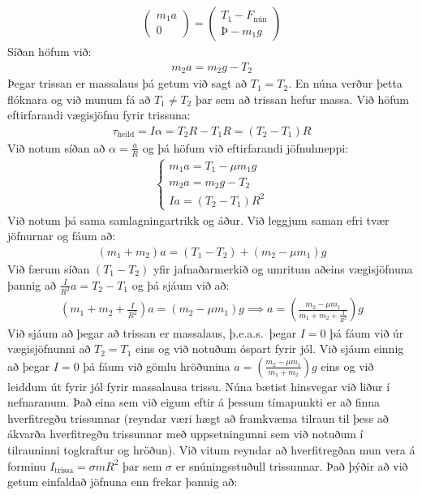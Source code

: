\begin{align*}
    \begin{pmatrix} m_1 a \\ 0 \end{pmatrix} = \begin{pmatrix}  T_1 - F_{\text{nún}} \\ Þ - m_1g \end{pmatrix}
\end{align*}
Síðan höfum við:
\begin{align*}
   m_2 a = m_2g - T_2
\end{align*}
Þegar trissan er massalaus þá getum við sagt að $T_1 = T_2$. En núna verður þetta flóknara og við munum fá að $T_1 \neq T_2$ þar sem að trissan hefur massa. Við höfum eftirfarandi vægisjöfnu fyrir trissuna:
\begin{align*}
    \tau_{\text{heild}} = I\alpha = T_2 R - T_1 R = (T_2-T_1)R
\end{align*}
Við notum síðan að $\alpha = \frac{a}{R}$ og þá höfum við eftirfarandi jöfnuhneppi:
\begin{align*}
    \begin{cases}
    m_1a = T_1 - \mu m_1 g \\
    m_2a = m_2g - T_2 \\
    Ia = (T_2 - T_1)R^2
    \end{cases}
\end{align*}
Við notum þá sama samlagningartrikk og áður. Við leggjum saman efri tvær jöfnurnar og fáum að:
\begin{align*}
    \left(m_1 + m_2\right)a = (T_1 - T_2) + \left( m_2 - \mu m_1\right)g
\end{align*}
Við færum síðan $(T_1 - T_2)$ yfir jafnaðarmerkið og umritum aðeins vægisjöfnuna þannig að $\frac{I}{R^2}a = T_2 - T_1$ og þá sjáum við að:
\begin{align*}
    \left(m_1 + m_2 + \frac{I}{R^2}\right)a = \left(m_2 - \mu m_1 \right)g \implies a = \left(\frac{m_2 - \mu m_1}{m_1 + m_2 + \frac{I}{R^2}} \right)g
\end{align*}
Við sjáum að þegar að trissan er massalaus, þ.e.a.s.~þegar $I = 0$ þá fáum við úr vægisjöfnunni að $T_2 = T_1$ eins og við notuðum óspart fyrir jól. Við sjáum einnig að þegar $I = 0$ þá fáum við gömlu hröðunina $a = \left(\frac{m_2 - \mu m_1}{m_1 + m_2}\right)g$ eins og við leiddum út fyrir jól fyrir massalausa trissu. Núna bætist hinsvegar við liður í nefnaranum. Það eina sem við eigum eftir á þessum tímapunkti er að finna hverfitregðu trissunnar (reyndar væri hægt að framkvæma tilraun til þess að ákvarða hverfitregðu trissunnar með uppsetningunni sem við notuðum í tilrauninni togkraftur og hröðun). Við vitum reyndar að hverfitregðan mun vera á forminu $I_{\text{trissa}} = \sigma mR^2$ þar sem $\sigma$ er snúningsstuðull trissunnar. Það þýðir að við getum einfaldað jöfnuna enn frekar þannig að:
